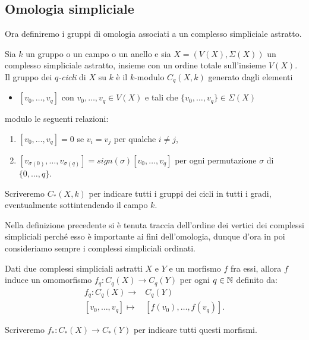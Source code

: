 \subsection{Omologia simpliciale}

Ora definiremo i gruppi di omologia associati a un complesso simpliciale astratto.

\begin{defn}
  Sia $k$ un gruppo o un campo o un anello e
  sia $X=(V(X),\Sigma(X))$ un complesso simpliciale astratto, insieme con un ordine totale sull'insieme $V(X)$. Il gruppo dei \emph{$q$-cicli} di $X$ su $k$ è il $k$-modulo $C_q(X,k)$ generato dagli elementi
  \begin{itemize}
    \item $[v_0,\dots, v_q]$ con $v_0,\dots, v_q\in V(X)$ e tali che $\{v_0,\dots,v_q\}\in\Sigma(X)$
  \end{itemize}
  modulo le seguenti relazioni:
  \begin{enumerate}
    \item $[v_0,\dots,v_q]=0$ se $v_i = v_j$ per qualche $i\neq j$,
    \item $[v_{\sigma(0)},\dots,v_{\sigma(q)}]=sign(\sigma)[v_0,\dots,v_q]$ per ogni permutazione $\sigma$ di $\{0,\dots,q\}$.
  \end{enumerate}

  Scriveremo $C_*(X,k)$ per indicare tutti i gruppi dei cicli in tutti i gradi, eventualmente sottintendendo il campo $k$.
\end{defn}

\begin{rmk}
  Nella definizione precedente si è tenuta traccia dell'ordine dei vertici dei complessi simpliciali perché esso è importante ai fini dell'omologia, dunque d'ora in poi consideriamo sempre i complessi simpliciali ordinati.
\end{rmk}

\begin{lemma}\label{lemma:sollcicli}
  Dati due complessi simpliciali astratti $X$ e $Y$ e un morfismo $f$ fra essi, allora $f$ induce un omomorfismo $f_q:C_q(X)\to C_q(Y)$ per ogni $q\in\mathbb{N}$ definito da:
  \begin{align*}
    f_q:C_q(X)\longrightarrow & C_q(Y)\\
    [v_0,\dots,v_q] \mapsto & [f(v_0),\dots,f(v_q)].
  \end{align*}

  Scriveremo $f_*:C_*(X)\to C_*(Y)$ per indicare tutti questi morfismi.
\end{lemma}

